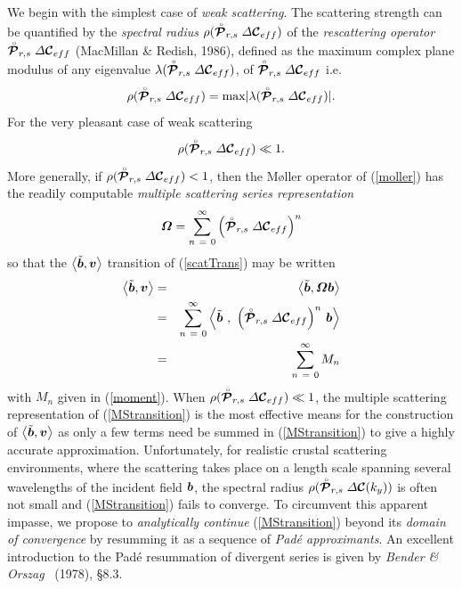 We begin with the simplest case of {\em weak scattering\/}. The scattering 
strength can be quantified by the {\em spectral radius\/} $\rho (\stackrel{\scriptscriptstyle _{\,\,\circ}}{ \mbox{\boldmath$\cal P$\unboldmath}}_{r,s}  
{\mit \Delta}{\mbox{\boldmath$\cal C$\unboldmath}}_{eff} )$ 
of the {\em rescattering operator\/} $\stackrel{\scriptscriptstyle _{\,\,\circ}}{ \mbox{\boldmath$\cal P$\unboldmath}}_{r,s} {\mit \Delta}{\mbox{\boldmath$\cal C$\unboldmath}}_{eff} $ 
(MacMillan \& Redish, 1986), defined as the maximum 
complex plane modulus of any eigenvalue 
$\lambda(\stackrel{\scriptscriptstyle _{\,\,\circ}}{ \mbox{\boldmath$\cal P$\unboldmath}}_{r,s}{\mit \Delta}{\mbox{\boldmath$\cal C$\unboldmath}}_{eff} )$, of $\stackrel{\scriptscriptstyle _{\,\,\circ}}{ \mbox{\boldmath$\cal P$\unboldmath}}_{r,s}{\mit \Delta}{\mbox{\boldmath$\cal C$\unboldmath}}_{eff}$ i.e.
\begin{equation} \label{rhoPS}
	\rho (\stackrel{\scriptscriptstyle _{\,\,\circ}}{ \mbox{\boldmath$\cal P$\unboldmath}}_{r,s}  {\mit \Delta}{\mbox{\boldmath$\cal C$\unboldmath}}_{eff} )=\mbox{max} 
|\lambda(\stackrel{\scriptscriptstyle _{\,\,\circ}}{ \mbox{\boldmath$\cal P$\unboldmath}}_{r,s}  
	{\mit \Delta}{\mbox{\boldmath$\cal C$\unboldmath}}_{eff})| .
\end{equation}
For the very pleasant case of weak scattering
\begin{equation}	\label{weakscatter}
\rho (\stackrel{\scriptscriptstyle _{\,\,\circ}}{ \mbox{\boldmath$\cal P$\unboldmath}}_{r,s}  {\mit \Delta}{\mbox{\boldmath$\cal C$\unboldmath}}_{eff} )	\ll 1 .
\end{equation}
More generally, if $\rho (\stackrel{\scriptscriptstyle _{\,\,\circ}}{ \mbox{\boldmath$\cal P$\unboldmath}}_{r,s}  {\mit \Delta}{\mbox{\boldmath$\cal C$\unboldmath}}_{eff} )	< 
1$, then the 
M{\o}ller operator of (\ref{moller}) has the readily 
computable {\em multiple scattering series representation\/}
\begin{equation}	\label{MSmoller}
{\mbox{\boldmath$\mit \Omega$\unboldmath}}=\sum\limits_{  n\ =\ 0}^{ \infty }
{\left({\stackrel{\scriptscriptstyle _{\,\,\circ}}{ \mbox{\boldmath$\cal P$\unboldmath}}_{r,s} {\mit \Delta}{\mbox{\boldmath$\cal C$\unboldmath}}_{eff}}\right)}^{n}
\end{equation}
so that the $\left\langle\tilde{\mbox{\boldmath$\mit b$\unboldmath}},{\mbox{\boldmath$\mit v$\unboldmath}}\right\rangle$ 
transition of 
(\ref{scatTrans}) may be written 
\begin{eqnarray} \label{MStransition}
\left\langle\tilde{\bmi  b},{\bmi  v}\right\rangle & = &
\left\langle\tilde{\bmi  b},{\bmi  \Omega}{\bmi  b}\right\rangle\nonumber\\
&=&
\sum\limits_{  n\ =\ 0}^{ \infty }
\left\langle{\tilde{\bmi   b}\  , \
{\left({\rf{\CB P}_{r,s} {\mit \Delta}{\CB C}_{eff}}\right)}^{n}\ 
{\bmi  b}}\right\rangle\nonumber\\
&=&\sum\limits_{  n\ =\ 0}^{ \infty } {  M}_{  n}
\end{eqnarray}
with ${  M}_{  n}$ given in (\ref{moment}). When $\rho (\stackrel{\scriptscriptstyle _{\,\,\circ}}{ \mbox{\boldmath$\cal P$\unboldmath}}_{r,s}  
{\mit \Delta}{\mbox{\boldmath$\cal C$\unboldmath}}_{eff} )	\ll 1$, the multiple scattering 
representation of 
(\ref{MStransition}) is the most effective means for the construction of 
$\left\langle\tilde{\mbox{\boldmath$\mit b$\unboldmath}},{\mbox{\boldmath$\mit v$\unboldmath}}\right\rangle$ as only a few terms 
need 
be 
summed in (\ref{MStransition}) to give a highly accurate approximation. 
Unfortunately, for realistic crustal scattering environments, where the 
scattering takes place on a length scale spanning several wavelengths of 
the incident field $\mbox{\boldmath$\mit b$\unboldmath}$, the spectral radius $\rho (\stackrel{\scriptscriptstyle _{\,\,\circ}}{ \mbox{\boldmath$\cal P$\unboldmath}}_{r,s}  
{\mit \Delta}{\mbox{\boldmath$\cal C$\unboldmath}}(k_y) )$ is often not small and (\ref{MStransition}) 
fails to converge.
To circumvent this apparent impasse, we propose to {\em analytically 
continue\/} (\ref{MStransition}) beyond its {\em domain of convergence\/}
 by resumming it as a sequence of {\em Pad\'{e} approximants\/}. An 
 excellent introduction to the Pad\'{e} resummation of divergent series is 
 given by {\em Bender \& Orszag  \/}~(1978), \S8.3.



